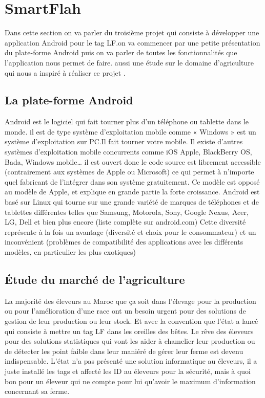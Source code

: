 \documentclass[11pt, a4paper, twoside]{book}
\begin{document}
\section{SmartFlah}
Dans cette section on va parler du troisième projet qui consiste à développer une application Android pour le tag LF.on va commencer par une petite présentation du plate-forme Android puis on va parler de toutes les fonctionnalités que l'application nous permet de faire. aussi une étude sur le domaine d'agriculture qui nous a inspiré à réaliser ce projet .\\
\subsection{La plate-forme Android}
Android est le logiciel qui fait tourner plus d’un téléphone ou tablette dans le monde.
il est de type système d’exploitation mobile comme « Windows » est un système d’exploitation sur PC.Il fait tourner votre mobile. Il existe d’autres systèmes d’exploitation mobile concurrents comme iOS Apple, BlackBerry OS, Bada, Windows mobile… il est ouvert donc le code source est librement accessible (contrairement aux systèmes de Apple ou Microsoft) ce qui permet à n’importe quel fabricant de l’intégrer dans son système gratuitement. Ce modèle est opposé au modèle de Apple, et explique en grande partie la forte croissance. Android est basé sur Linux qui tourne sur une grande variété de marques de téléphones et de tablettes différentes telles que Samsung, Motorola, Sony, Google Nexus, Acer, LG, Dell et bien plus encore (liste complète sur android.com) Cette diversité représente à la fois un avantage (diversité et choix pour le consommateur) et un inconvénient (problèmes de compatibilité des applications avec les différents modèles, en particulier les plus exotiques)
\subsection{Étude du marché de l'agriculture}
La majorité des éleveurs au Maroc que ça soit dans l'élevage pour la production ou pour l'amélioration d'une race ont un besoin urgent pour des solutions de gestion de leur production ou leur stock. Et avec la convention que l'état a lancé qui consiste à mettre un tag LF dans les oreilles des bêtes. Le rêve des éleveurs pour des solutions statistiques qui vont les aider à chamelier leur production ou de détecter les point faible dans leur maniéré de gérer leur ferme est devenu indispensable. L'état n'a pas présenté une solution informatique au éleveurs, il a juste installé les tags et affecté les ID au éleveurs pour la sécurité, mais à quoi bon pour un éleveur qui ne compte pour lui qu'avoir le maximum d'information concernant sa ferme.\\
\end{document}
